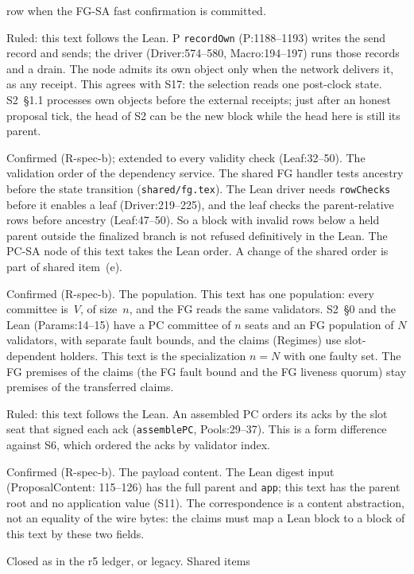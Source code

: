 \documentclass{article}
\newcommand{\nm}[1]{\nolinkurl{#1}}
\begin{document}
\begin{description}
  row when the FG-SA fast confirmation is committed.
\item[S45] Ruled: this text follows the Lean.  P \nm{recordOwn}
  (P:1188--1193) writes the send record and sends; the driver
  (Driver:574--580, Macro:194--197) runs those records and a drain.  The
  node admits its own object only when the network delivers it, as any
  receipt.  This agrees with S17: the selection reads one post-clock
  state.  S2~\S1.1 processes own objects before the external receipts;
  just after an honest proposal tick, the head of S2 can be the new block
  while the head here is still its parent.
\item[S46] Confirmed (R-spec-b); extended to every validity check
  (Leaf:32--50).  The validation order of the dependency service.  The shared
  FG handler tests ancestry before the state transition
  (\nm{shared/fg.tex}).  The Lean driver needs \nm{rowChecks} before it
  enables a leaf (Driver:219--225), and the leaf checks the
  parent-relative rows before ancestry (Leaf:47--50).  So a block with
  invalid rows below a held parent outside the finalized branch is not
  refused definitively in the Lean.  The PC-SA node of this text takes
  the Lean order.  A change of the shared order is part of shared
  item~(e).
\item[S42] Confirmed (R-spec-b).  The population.  This text has one population: every committee
  is~$V$, of size~$n$, and the FG reads the same validators.  S2~\S0 and
  the Lean (Params:14--15) have a PC committee of $n$ seats and an FG
  population of $N$ validators, with separate fault bounds, and the claims
  (Regimes) use slot-dependent holders.  This text is the specialization
  $n=N$ with one faulty set.  The FG premises of the claims (the FG fault
  bound and the FG liveness quorum) stay premises of the transferred
  claims.
\item[S43] Ruled: this text follows the Lean.  An assembled PC orders
  its acks by the slot seat that signed each ack (\nm{assemblePC},
  Pools:29--37).  This is a form difference against S6, which ordered
  the acks by validator index.
\item[S44] Confirmed (R-spec-b).  The payload content.  The Lean digest input (ProposalContent:
  115--126) has the full parent and \nm{app}; this text has the parent root
  and no application value (S11).  The correspondence is a content
  abstraction, not an equality of the wire bytes: the claims must map a
  Lean block to a block of this text by these two fields.
\item[O01--O14] Closed as in the r5 ledger, or legacy.  Shared items

\end{description}
\end{document}
